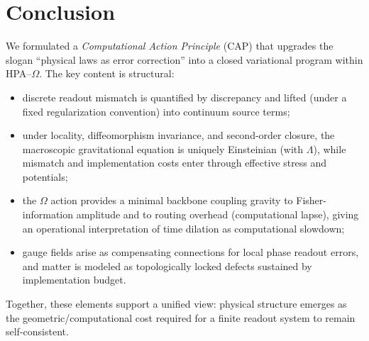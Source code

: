 \section{Conclusion}
\label{sec:conclusion}

We formulated a \emph{Computational Action Principle} (CAP) that upgrades the slogan ``physical laws as error correction'' into a closed variational program within HPA--$\Omega$. The key content is structural:
\begin{itemize}
  \item discrete readout mismatch is quantified by discrepancy and lifted (under a fixed regularization convention) into continuum source terms;
  \item under locality, diffeomorphism invariance, and second-order closure, the macroscopic gravitational equation is uniquely Einsteinian (with $\Lambda$), while mismatch and implementation costs enter through effective stress and potentials;
  \item the $\Omega$ action provides a minimal backbone coupling gravity to Fisher-information amplitude and to routing overhead (computational lapse), giving an operational interpretation of time dilation as computational slowdown;
  \item gauge fields arise as compensating connections for local phase readout errors, and matter is modeled as topologically locked defects sustained by implementation budget.
\end{itemize}
Together, these elements support a unified view: physical structure emerges as the geometric/computational cost required for a finite readout system to remain self-consistent.


